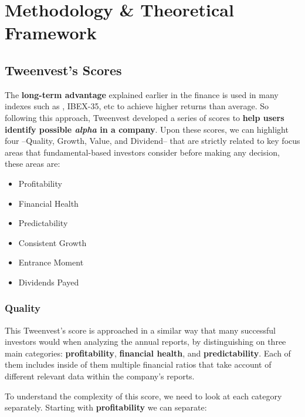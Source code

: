 \documentclass[11pt,english,a4paper,hidelinks]{book}
\begin{document}
\chapter{Methodology \& Theoretical Framework}


\section{Tweenvest's Scores}

The \textbf{long-term advantage} explained earlier in the finance is used in many indexes such as \textcite{msci2024fundamental}, IBEX-35, etc to achieve higher returns than average. So following this approach, Tweenvest developed a series of scores to \textbf{help users identify possible \textit{alpha} in a company}. Upon these scores, we can highlight four --Quality, Growth, Value, and Dividend-- that are strictly related to key focus areas that fundamental-based investors consider before making any decision, these areas are:
\begin{itemize}
    \item Profitability
    \item Financial Health
    \item Predictability
    \item Consistent Growth
    \item Entrance Moment
    \item Dividends Payed
\end{itemize}

\subsection{Quality}

\noindent This Tweenvest's score is approached in a similar way that many successful investors would when analyzing the annual reports, by distinguishing on three main categories: \textbf{profitability}, \textbf{financial health}, and \textbf{predictability}. Each of them includes inside of them multiple financial ratios that take account of different relevant data within the company's reports.

\vspace{0.5cm}
\noindent To understand the complexity of this score, we need to look at each category separately. Starting with \textbf{profitability} we can separate:
\end{document}
